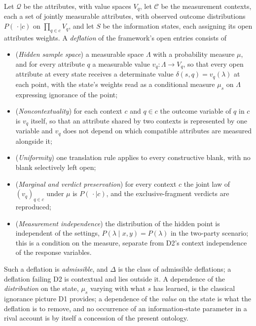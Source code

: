 \begin{definition}\label{def:deflation}
Let $\mathcal{Q}$ be the attributes, with value spaces $V_q$, let $\mathcal{C}$ be the measurement contexts, each a set of jointly measurable attributes, with observed outcome distributions $P(\,\cdot \mid c)$ on $\prod_{q \in c} V_q$, and let $S$ be the information states, each assigning its open attributes weights. A \emph{deflation} of the framework's open entries consists of
\begin{itemize}
\item[\textbf{D1}] (\emph{Hidden sample space}) a measurable space $\Lambda$ with a probability measure $\mu$, and for every attribute $q$ a measurable value $v_q : \Lambda \to V_q$, so that every open attribute at every state receives a determinate value $\delta(s,q) = v_q(\lambda)$ at each point, with the state's weights read as a conditional measure $\mu_s$ on $\Lambda$ expressing ignorance of the point;
\item[\textbf{D2}] (\emph{Noncontextuality}) for each context $c$ and $q \in c$ the outcome variable of $q$ in $c$ is $v_q$ itself, so that an attribute shared by two contexts is represented by one variable and $v_q$ does not depend on which compatible attributes are measured alongside it;
\item[\textbf{D3}] (\emph{Uniformity}) one translation rule applies to every constructive blank, with no blank selectively left open;
\item[\textbf{D4}] (\emph{Marginal and verdict preservation}) for every context $c$ the joint law of $(v_q)_{q \in c}$ under $\mu$ is $P(\,\cdot \mid c)$, and the exclusive-fragment verdicts are reproduced;
\item[\textbf{D5}] (\emph{Measurement independence}) the distribution of the hidden point is independent of the settings, $P(\lambda \mid x, y) = P(\lambda)$ in the two-party scenario; this is a condition on the measure, separate from D2's context independence of the response variables.
\end{itemize}
Such a deflation is \emph{admissible}, and $\Delta$ is the class of admissible deflations; a deflation failing D2 is contextual and lies outside it. A dependence of the \emph{distribution} on the state, $\mu_s$ varying with what $s$ has learned, is the classical ignorance picture D1 provides; a dependence of the \emph{value} on the state is what the deflation is to remove, and no occurrence of an information-state parameter in a rival account is by itself a concession of the present ontology.
\end{definition}

